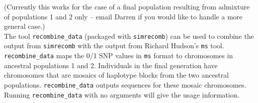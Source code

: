 \documentclass{article}
\begin{document}
(Currently this works for the case of a final population resulting from
admixture of populations 1 and 2 only -- email Darren if you would like
to handle a more general case.) \\

\noindent The tool \texttt{recombine\_data} (packaged with \texttt{simrecomb}) can be
used to combine the output from \texttt{simrecomb} with the output from Richard
Hudson's \texttt{ms} tool. \\

\noindent \texttt{recombine\_data} maps the 0/1 SNP values in \texttt{ms} format to
chromosomes in ancestral populations 1 and 2.  Individuals in the final
generation have chromosomes that are mosaics of haplotype blocks from the two
ancestral populations.  \texttt{recombine\_data} outputs sequences for these
mosaic chromosomes. \\

\noindent Running \texttt{recombine\_data} with no arguments will give the
usage information. \\
\end{document}
